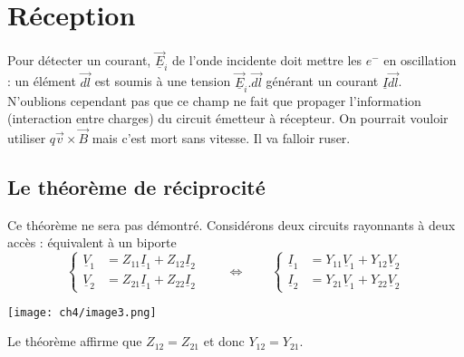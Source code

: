 \section{Réception}
Pour détecter un courant, $\underline{\vec{E}}_i$ de l'onde incidente doit mettre les $e^-$ 
en oscillation : un élément $\vec{dl}$ est soumis à une tension $\underline{\vec{E}}_i.\vec{dl}$ générant 
un courant $\underline{I}\vec{dl}$. N'oublions cependant pas que ce champ ne fait que propager 
l'information (interaction entre charges) du circuit émetteur à récepteur. On pourrait 
vouloir utiliser $q\vec{v}\times\vec{B}$ mais c'est mort sans vitesse. Il va falloir ruser.

	\subsection{Le théorème de réciprocité}
	Ce théorème ne sera pas démontré. Considérons deux circuits rayonnants à deux accès : 
	équivalent à un biporte
	\begin{equation}
	\left\{\begin{array}{ll}
	\underline{V}_1 &= Z_{11}\underline{I}_1 +Z_{12}\underline{I}_2\\
	\underline{V}_2 &= Z_{21}\underline{I}_1 +Z_{22}\underline{I}_2	
	\end{array}\right.\qquad\Leftrightarrow\qquad
	\left\{\begin{array}{ll}
	\underline{I}_1 &= Y_{11}\underline{V}_1 + Y_{12}\underline{V}_2\\
	\underline{I}_2 &= Y_{21}\underline{V}_1 + Y_{22}\underline{V}_2	
	\end{array}\right.
	\end{equation}
	\begin{center}
	\texttt{[image: ch4/image3.png]}
	\end{center}
	Le théorème affirme que $Z_{12}=Z_{21}$ et donc $Y_{12}=Y_{21}$.
	
	
